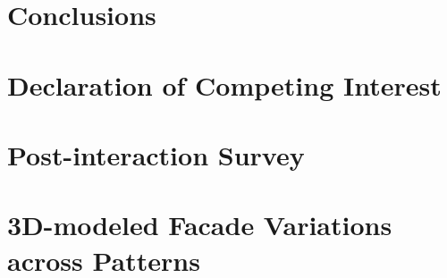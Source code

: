 \documentclass[final,5p,times]{elsarticle}%
\begin{document}
\begin{linenumbers}


\section{Conclusions}
\label{sec:Conclusion}




\section{Declaration of Competing Interest}
\label{sec:DeclarationInterest}


%

\end{linenumbers}




\newpage
\appendix


\section{Post-interaction Survey}
\label{sec:Annexsurvey}


\section{3D-modeled Facade Variations across Patterns}
\label{sec:AnnexVariations}

\end{document}
